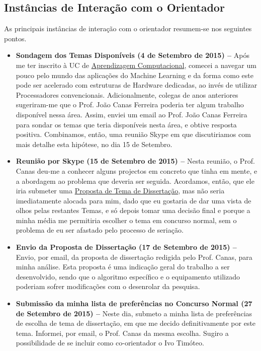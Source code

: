\documentclass[a4paper, onecolumn, 10pt]{article}
\begin{document}
	\subsection{Instâncias de Interação com o Orientador}
	As principais instâncias de interação com o orientador resumem-se nos seguintes pontos.
	\begin{itemize}
		\item
			\textbf{Sondagem dos Temas Disponíveis (4 de Setembro de 2015) --} Após me ter inscrito à UC de \href{https://sigarra.up.pt/feup/pt/ucurr_geral.ficha_uc_view?pv_ocorrencia_id=374787}{Aprendizagem Computacional}, comecei a navegar um pouco pelo mundo das aplicações do Machine Learning e da forma como este pode ser acelerado com estruturas de Hardware dedicadas, ao invés de utilizar Processadores convencionais. Adicionalmente, colegas de anos anteriores sugeriram-me que o Prof. João Canas Ferreira poderia ter algum trabalho disponível nessa área. Assim, enviei um email ao Prof. João Canas Ferreira para sondar os temas que teria disponíveis nesta área, e obtive resposta positiva. Combinamos, então, uma reunião Skype em que discutiriamos com mais detalhe esta hipótese, no dia 15 de Setembro.

		\item
			\textbf{Reunião por Skype (15 de Setembro de 2015) --} Nesta reunião, o Prof. Canas deu-me a conhecer alguns projectos em concreto que tinha em mente, e a abordagem ao problema que deveria ser seguida. Acordamos, então, que ele iria submeter uma \href{https://sigarra.up.pt/feup/pt/estagios_empresas.ver_dados_proposta?p_id=191431&pv_perfil=ALU&p_aluno_id=116261}{Proposta de Tema de Dissertação}, mas não seria imediatamente alocada para mim, dado que eu gostaria de dar uma vista de olhos pelas restantes Temas, e só depois tomar uma decisão final e porque a minha média me permitiria escolher o tema em concurso normal, sem o problema de eu ser afastado pelo processo de seriação.

		\item
			\textbf{Envio da Proposta de Dissertação (17 de Setembro de 2015) --} Envio, por email, da proposta de dissertação redigida pelo Prof. Canas, para minha análise. Esta proposta é uma indicação geral do trabalho a ser desenvolvido, sendo que o algoritmo específico e o equipamento utilizado poderiam sofrer modificações com o desenrolar da pesquisa.

		\item
			\textbf{Submissão da minha lista de preferências no Concurso Normal (27 de Setembro de 2015) --} Neste dia, submeto a minha lista de preferências de escolha de tema de dissertação, em que me decido definitivamente por este tema. Informei, por email,  o Prof. Canas da mesma escolha. Sugiro a possibilidade de se incluir como co-orientador o Ivo Timóteo.


\end{itemize}
\end{document}
